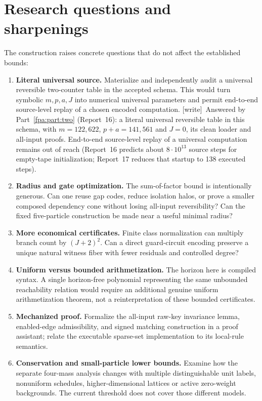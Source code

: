 \documentclass[11pt,a4paper]{article}
\numberwithin{equation}{section}
\newcommand{\wtag}{\textup{[write]}}
\begin{document}
\section{Research questions and sharpenings}\label{fpa:rep:15:last}
The construction raises concrete questions that do not affect the established
bounds:
\begin{enumerate}
\item \textbf{Literal universal source.} Materialize and independently audit a
universal reversible two-counter table in the accepted schema. This would turn
symbolic $m,p,a,J$ into numerical universal parameters and permit end-to-end
source-level replay of a chosen encoded computation.
\wtag\ Answered by Part~\ref{fpa:part:two} (Report~16): a literal universal reversible table in this schema, with $m=122{,}622$, $p+a=141{,}561$ and $J=0$, its clean loader and all-input proofs. End-to-end source-level replay of a universal computation remains out of reach (Report~16 predicts about $8\cdot10^{13}$ source steps for empty-tape initialization; Report~17 reduces that startup to 138 executed steps).

\item \textbf{Radius and gate optimization.} The sum-of-factor bound is
intentionally generous. Can one reuse gap codes, reduce isolation halos, or
prove a smaller composed dependency cone without losing all-input reversibility?
Can the fixed five-particle construction be made near a useful minimal radius?
\item \textbf{More economical certificates.} Finite class normalization can
multiply branch count by $(J+2)^2$. Can a direct guard-circuit encoding preserve
a unique natural witness fiber with fewer residuals and controlled degree?
\item \textbf{Uniform versus bounded arithmetization.} The horizon here is
compiled syntax. A single horizon-free polynomial representing the same
unbounded reachability relation would require an additional genuine uniform
arithmetization theorem, not a reinterpretation of these bounded certificates.
\item \textbf{Mechanized proof.} Formalize the all-input raw-key invariance
lemma, enabled-edge admissibility, and signed matching construction in a proof
assistant; relate the executable sparse-set implementation to its local-rule
semantics.
\item \textbf{Conservation and small-particle lower bounds.} Examine how the
separate four-mass analysis changes with multiple distinguishable unit labels,
nonuniform schedules, higher-dimensional lattices or active zero-weight
backgrounds. The current threshold does not cover those different models.
\end{enumerate}
\end{document}
